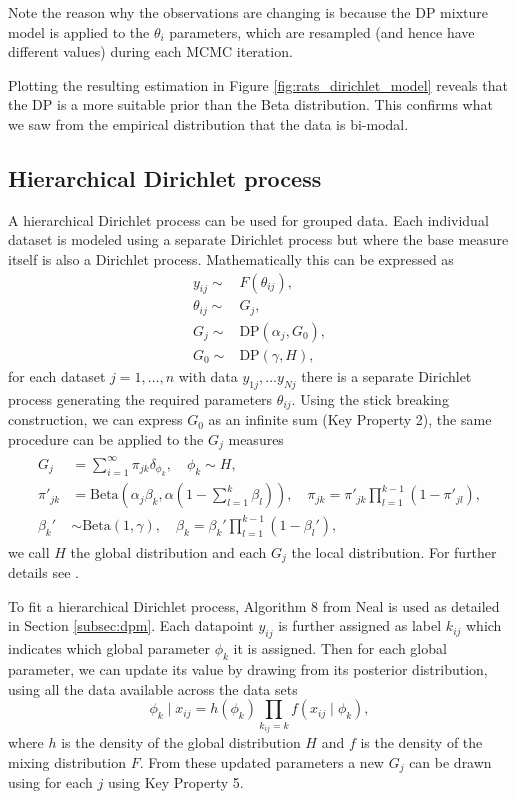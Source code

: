 \documentclass[nojss]{jss}
\begin{document}
Note the reason why the observations are changing is because the DP mixture model is applied to the $\theta_i$ parameters, which are resampled (and hence have different values) during each MCMC iteration.

Plotting the resulting estimation in Figure \ref{fig:rats_dirichlet_model} reveals that the DP is a more suitable prior than the Beta distribution. This confirms what we saw from the empirical distribution that the data is bi-modal.

\subsection{Hierarchical Dirichlet process}
A hierarchical Dirichlet process \cite{teh_sharing_2005} can be used for grouped data. Each individual dataset is modeled using a separate Dirichlet process but where the base measure itself is also a Dirichlet process. Mathematically this can be expressed as
\begin{align*}
y_{ij}  \sim & F(\theta _{ij}), \\
\theta _{ij} \sim & G_j, \\
G_j \sim & \text{DP} (\alpha _j, G_0 ), \\
G_0 \sim & \text{DP} (\gamma, H),
\end{align*}
for each dataset $j=1, \dots,n$ with data $y_{1j}, \ldots y_{Nj}$ there is a separate Dirichlet process generating the required parameters $\theta _{ij}$. Using the stick breaking construction, we can express $G_0$ as an infinite sum (Key Property 2), the same procedure can be applied to the $G_j$ measures
\begin{align}
\begin{split}
G_j & = \sum _{i=1} ^\infty \pi _{jk} \delta _{\phi _k}, \quad \phi _k  \sim H, \\
\pi ' _{jk} & = \text{Beta}  \left( \alpha _j \beta _k , \alpha \left( 1 - \sum _{l=1} ^k \beta _l \right) \right), \quad
\pi _{jk}  = \pi ' _{jk} \prod _{l=1} ^{k-1} ( 1- \pi ' _{jl} ), \\
\beta _k ' &  \sim  \text{Beta} \left(1, \gamma \right), \quad
\beta _k  = \beta _k ' \prod_ {l=1} ^{k-1} (1 - \beta _l '),
\end{split}
\label{eq:hierbase}
\end{align}
we call $H$ the global distribution and each $G_j$ the local distribution. For further details see \cite{teh_sharing_2005}.

To fit a hierarchical Dirichlet process, Algorithm 8 from Neal is used as detailed in Section \ref{subsec:dpm}. Each datapoint $y_{ij}$ is further assigned as label $k_{ij}$ which indicates which global parameter $\phi _k$ it is assigned. Then for each global parameter, we can update its value by drawing from its posterior distribution, using all the data available across the data sets
\begin{equation}
\phi _k \mid x_{ij} = h(\phi _k) \prod _{k_{ij} = k} f(x_{ij} \mid \phi _k ) ,
\label{eq:hierposterior}
\end{equation}
where $h$ is the density of the global distribution $H$ and $f$ is the density of the mixing distribution $F$. From these updated parameters a new $G_j$ can be drawn using for each $j$ using Key Property 5.
\end{document}
